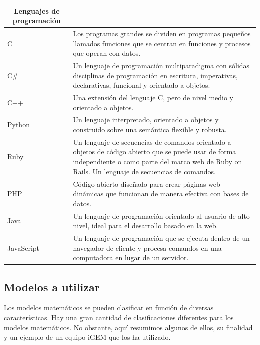 \documentclass[11pt, letterpaper, spanish]{article}
\begin{document}
{{\begin{table}[h]
\begin{tabular}{| m{3cm} | m{9cm}|}
\hline
\multicolumn{1}{|c|}{\textbf{Lenguajes de programación}}                                                                                                           \\ \hline
\multicolumn{1}{|l|}{C} & Los programas grandes se dividen en programas pequeños llamados funciones que se centran en funciones y procesos que operan con datos. \\ \hline
\multicolumn{1}{|l|}{C\#} &
  Un lenguaje de programación multiparadigma con sólidas disciplinas de programación en escritura, imperativas, declarativas, funcional y orientado a objetos. \\ \hline
\multicolumn{1}{|l|}{C++}    & Una extensión del lenguaje C, pero de nivel medio y orientado a objetos.                                                  \\ \hline
\multicolumn{1}{|l|}{Python} & Un lenguaje interpretado, orientado a objetos y construido sobre una semántica flexible y robusta.                                    \\ \hline
\multicolumn{1}{|l|}{Ruby}   & Un lenguaje de secuencias de comandos orientado a objetos de código abierto que se puede usar de forma independiente o como parte del marco web de Ruby on Rails. Un lenguaje de secuencias de comandos.   \\ \hline
\multicolumn{1}{|l|}{PHP}    & Código abierto diseñado para crear páginas web dinámicas que funcionan de manera efectiva con bases de datos.                    \\ \hline
\multicolumn{1}{|l|}{Java}   & Un lenguaje de programación orientado al usuario de alto nivel, ideal para el desarrollo basado en la web.                                              \\ \hline
\multicolumn{1}{|l|}{JavaScript} &
  Un lenguaje de programación que se ejecuta dentro de un navegador de cliente y procesa comandos en una computadora en lugar de un servidor. \\ \hline
\end{tabular}
\end{table}


\subsection{Modelos a utilizar}
\par{Los modelos matemáticos se pueden clasificar en función de diversas características. Hay una gran cantidad de clasificaciones diferentes para los modelos matemáticos. No obstante, aquí resumimos algunos de ellos, su finalidad y un ejemplo de un equipo iGEM que los ha utilizado.} 

}}
\end{document}
